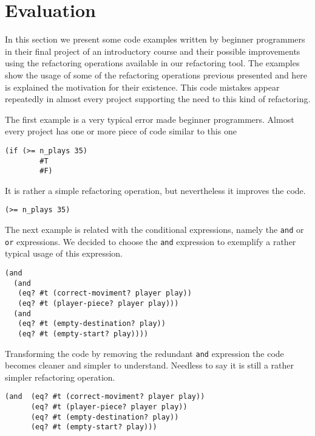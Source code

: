 



\section{Evaluation}
In this section we present some code examples written by beginner programmers
in their final project of an introductory course and their possible improvements
using the refactoring operations available in our refactoring tool.
The examples show the usage of some of the refactoring operations previous presented
and here is explained the motivation for their existence.
This code mistakes appear repeatedly in almost every project supporting the need to
this kind of refactoring.
\lstset{style=racket}


The first example is a very typical error made beginner programmers.
Almost every project has one or more piece of code similar to this one
\begin{lstlisting}[basicstyle=\ttfamily]
  (if (>= n_plays 35)
        #T
        #F)
\end{lstlisting}
It is rather a simple refactoring operation, but nevertheless it improves the code.
\begin{lstlisting}[basicstyle=\ttfamily]
  (>= n_plays 35)
\end{lstlisting}

The next example is related with the conditional expressions, namely the {\tt and}
or {\tt or} expressions. We decided to choose the {\tt and} expression to exemplify a
rather typical usage of this expression.
\begin{lstlisting}[basicstyle=\ttfamily]
(and
  (and
   (eq? #t (correct-moviment? player play))
   (eq? #t (player-piece? player play)))
  (and
   (eq? #t (empty-destination? play))
   (eq? #t (empty-start? play))))
\end{lstlisting}


Transforming the code by removing the redundant {\tt and} expression the code becomes
cleaner and simpler to understand. Needless to say it is still a rather simpler
refactoring operation.
\begin{lstlisting}[basicstyle=\ttfamily]
(and  (eq? #t (correct-moviment? player play))
      (eq? #t (player-piece? player play))
      (eq? #t (empty-destination? play))
      (eq? #t (empty-start? play)))
\end{lstlisting}

